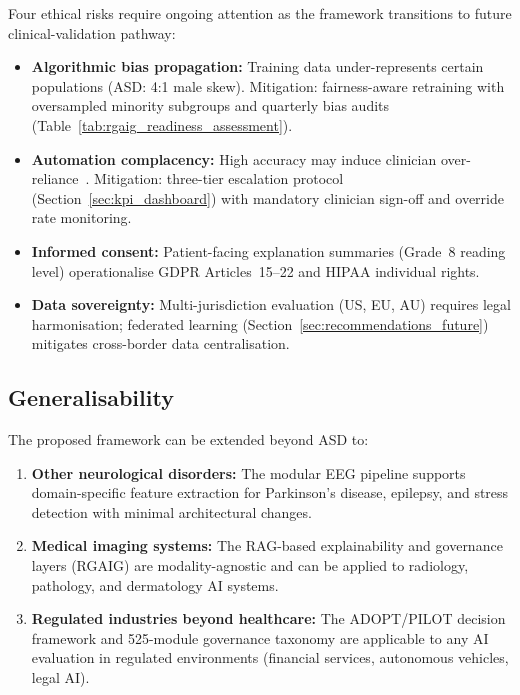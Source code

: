 Four ethical risks require ongoing attention as the framework transitions to future clinical-validation pathway:

\begin{itemize}[nosep]
    \item \textbf{Algorithmic bias propagation:} Training data under-represents certain populations (ASD: 4:1 male skew). Mitigation: fairness-aware retraining with oversampled minority subgroups and quarterly bias audits (Table~\ref{tab:rgaig_readiness_assessment}).
    \item \textbf{Automation complacency:} High accuracy may induce clinician over-reliance~\cite{rajkomar2019healthcare}. Mitigation: three-tier escalation protocol (Section~\ref{sec:kpi_dashboard}) with mandatory clinician sign-off and override rate monitoring.
    \item \textbf{Informed consent:} Patient-facing explanation summaries (Grade~8 reading level) operationalise GDPR Articles~15--22 and HIPAA individual rights.
    \item \textbf{Data sovereignty:} Multi-jurisdiction evaluation (US, EU, AU) requires legal harmonisation; federated learning (Section~\ref{sec:recommendations_future}) mitigates cross-border data centralisation.
\end{itemize}


\subsection{Generalisability}

The proposed framework can be extended beyond ASD to:

\begin{enumerate}[label=(\alph*)]
    \item \textbf{Other neurological disorders:} The modular EEG pipeline supports domain-specific feature extraction for Parkinson's disease, epilepsy, and stress detection with minimal architectural changes.
    \item \textbf{Medical imaging systems:} The RAG-based explainability and governance layers (RGAIG) are modality-agnostic and can be applied to radiology, pathology, and dermatology AI systems.
    \item \textbf{Regulated industries beyond healthcare:} The ADOPT/PILOT decision framework and 525-module governance taxonomy are applicable to any AI evaluation in regulated environments (financial services, autonomous vehicles, legal AI).
\end{enumerate}

